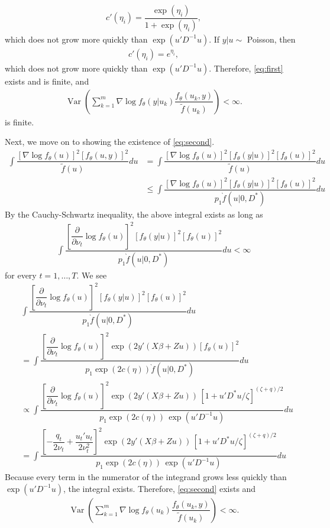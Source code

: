 \documentclass{article}
\DeclareMathOperator{\var}{Var}
\begin{document}
\begin{align}
c'(\eta_i)= \dfrac{\exp(\eta_i)}{1+\exp(\eta_i)},
\end{align}
which does not grow more quickly than $\exp(u'D^{-1}u)$. If $y|u \sim$ Poisson, then
\begin{align}
c'(\eta_i)= e^{\eta_i},
\end{align}
which does not grow more quickly than $\exp(u'D^{-1}u)$. Therefore, \eqref{eq:first} exists and is finite, and 
\begin{align}
\var \left( \sum_{k=1}^m \nabla \log f_\theta (y|u_k) \dfrac{f_\theta(u_k,y)}{\tilde{f}(u_k)} \right) < \infty.
\end{align}
is finite.

Next, we move on to showing the existence of \eqref{eq:second}.
\begin{align}
\int \dfrac{ \left[ \nabla \log f_\theta (u) \right]^2 \left[ f_\theta(u,y)\right]^2}{\tilde{f}(u)} du &= 
\int \dfrac{ \left[ \nabla \log f_\theta (u) \right]^2 \left[ f_\theta(y|u)\right]^2  \left[ f_\theta(u)\right]^2}{\tilde{f}(u)} du\\
&\leq \int \dfrac{ \left[ \nabla \log f_\theta (u) \right]^2 \left[ f_\theta(y|u)\right]^2  \left[ f_\theta(u)\right]^2}{p_1 \grave{f}(u|0,D^*)} du
\end{align}
By the Cauchy-Schwartz inequality, the above integral exists as long as  
\begin{align}
\int \dfrac{ \left[ \dfrac{\partial}{\partial \nu_t} \log f_\theta (u) \right]^2 \left[ f_\theta(y|u)\right]^2  \left[ f_\theta(u)\right]^2}{p_1 \grave{f}(u|0,D^*)} du < \infty
\end{align}
for every $t=1,\ldots, T$. We see
\begin{align}
&\int \dfrac{ \left[ \dfrac{\partial}{\partial \nu_t} \log f_\theta (u) \right]^2 \left[ f_\theta(y|u)\right]^2  \left[ f_\theta(u)\right]^2}{p_1 \grave{f}(u|0,D^*)} du \\
&= \int \dfrac{ \left[ \dfrac{\partial}{\partial \nu_t} \log f_\theta (u) \right]^2 \exp(2y'(X\beta+Zu)   )  \left[ f_\theta(u)\right]^2}{p_1 \exp(2c(\eta))    \grave{f}(u|0,D^*)} du \\
&\propto \int \dfrac{ \left[ \dfrac{\partial}{\partial \nu_t} \log f_\theta (u) \right]^2 \exp(2y'(X\beta+Zu)   ) \,   \left[ 1+u'D^*u/\zeta  \right]^{(\zeta+q)/2} }{p_1 \exp(2c(\eta)) \, \exp(u'D^{-1}u)  } du\\
&= \int \dfrac{ \left[  -\dfrac{q_t}{2 \nu_t} + \dfrac{u_t'u_t}{2 \nu_t^2}   \right]^2 \exp(2y'(X\beta+Zu)   ) \,   \left[ 1+u'D^*u/\zeta  \right]^{(\zeta+q)/2} }{p_1 \exp(2c(\eta)) \, \exp(u'D^{-1}u)  } du
\end{align}
Because every term in the numerator of the integrand grows less quickly than $\exp(u'D^{-1}u)$, the integral exists.  Therefore, \eqref{eq:second} exists and 
\begin{align}
\var \left(\sum_{k=1}^m \nabla \log f_\theta (u_k) \dfrac{f_\theta(u_k,y)}{\tilde{f}(u_k)} \right) < \infty.
\end{align}
\end{document}
